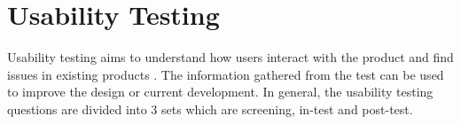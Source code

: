 \documentclass[12pt,oneside,openright,a4paper]{cpe-english-project}
\begin{document}
%


%
%
%

\section{Usability Testing}
\hspace{2em}Usability testing aims to understand how users interact with the product and find issues in existing products \cite{nick2021usability}. The information gathered from the test can be used to improve the design or current development. In general, the usability testing questions are divided into 3 sets which are screening, in-test and post-test.
\end{document}

